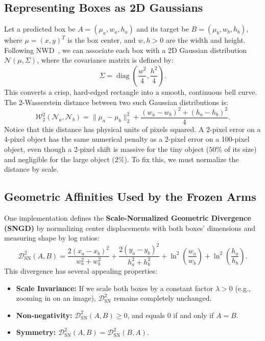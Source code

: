 \documentclass[11pt,a4paper]{article}
\begin{document}
\subsection{Representing Boxes as 2D Gaussians}
Let a predicted box be $A = (\mu_a, w_a, h_a)$ and its target be $B = (\mu_b, w_b, h_b)$, where $\mu = (x, y)^T$ is the box center, and $w, h > 0$ are the width and height. Following NWD~\cite{wang2021nwd}, we can associate each box with a 2D Gaussian distribution $\mathcal{N}(\mu, \Sigma)$, where the covariance matrix is defined by:
\begin{equation}
  \Sigma = \operatorname{diag}\left(\frac{w^2}{4}, \frac{h^2}{4}\right).
\end{equation}
This converts a crisp, hard-edged rectangle into a smooth, continuous bell curve. The 2-Wasserstein distance between two such Gaussian distributions is:
\begin{equation}
  \label{eq:wasserstein}
  \mathcal{W}_2^2(\mathcal{N}_a, \mathcal{N}_b)
  = \|\mu_a - \mu_b\|_2^2 + \frac{(w_a - w_b)^2 + (h_a - h_b)^2}{4}.
\end{equation}
Notice that this distance has physical units of pixels squared. A 2-pixel error on a 4-pixel object has the same numerical penalty as a 2-pixel error on a 100-pixel object, even though a 2-pixel shift is massive for the tiny object ($50\%$ of its size) and negligible for the large object ($2\%$). To fix this, we must normalize the distance by scale.

\subsection{Geometric Affinities Used by the Frozen Arms}
One implementation defines the \textbf{Scale-Normalized Geometric Divergence (SNGD)} by normalizing center displacements with both boxes' dimensions and measuring shape by log ratios:
\begin{equation}
  \label{eq:sngd}
  \mathcal{D}_{\mathrm{SN}}^2(A, B)
  = \frac{2(x_a - x_b)^2}{w_a^2 + w_b^2}
  + \frac{2(y_a - y_b)^2}{h_a^2 + h_b^2}
  + \ln^2\left(\frac{w_a}{w_b}\right)
  + \ln^2\left(\frac{h_a}{h_b}\right).
\end{equation}
This divergence has several appealing properties:
\begin{itemize}
  \item \textbf{Scale Invariance:} If we scale both boxes by a constant factor $\lambda > 0$ (e.g., zooming in on an image), $\mathcal{D}_{\mathrm{SN}}^2$ remains completely unchanged.
  \item \textbf{Non-negativity:} $\mathcal{D}_{\mathrm{SN}}^2(A, B) \ge 0$, and equals $0$ if and only if $A = B$.
  \item \textbf{Symmetry:} $\mathcal{D}_{\mathrm{SN}}^2(A, B) = \mathcal{D}_{\mathrm{SN}}^2(B, A)$.
\end{itemize}
\end{document}
